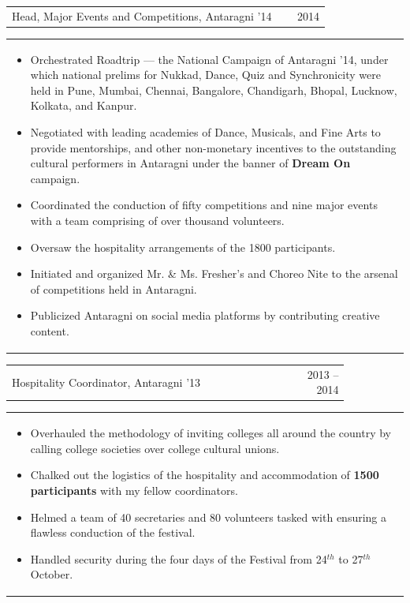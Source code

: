 \documentclass[a4paper,10pt]{article} %
\newcommand{\iproject}[3]{
    \begin{tabular}{p{0.85\linewidth}r}
        \textcolor{NavyBlue}{#2} & \multicolumn{1}{m{3cm}}{\raggedleft \textsc{#1}}\\
    \end{tabular}
    \begin{tabular}{p{\linewidth}}
    \vspace{-0.3cm}
        \footnotesize{#3}
    \end{tabular}
    \vspace{-0.5cm}
}
\begin{document}
\iproject {2014}
          {Head, Major Events and Competitions, Antaragni '14}
          {
               \begin{itemize}[leftmargin=0.5cm]
                    \item Orchestrated Roadtrip --- the National Campaign of Antaragni '14, under which national prelims for Nukkad,
                        Dance, Quiz and Synchronicity were held in Pune, Mumbai, Chennai, Bangalore, Chandigarh, Bhopal, Lucknow,
                        Kolkata, and Kanpur.
                    \item Negotiated with leading academies of Dance, Musicals, and Fine Arts to provide mentorships, and other
                        non-monetary incentives to the outstanding cultural performers in Antaragni under the banner
                        of \textbf{Dream On} campaign.
                    \item Coordinated the conduction of fifty competitions and nine major events with a team comprising of over
                        thousand volunteers.
                    \item Oversaw the hospitality arrangements of the 1800 participants.
                    \item Initiated and organized Mr. \& Ms. Fresher's and Choreo Nite to the arsenal of competitions
                        held in Antaragni.
                    \item Publicized Antaragni on social media platforms by contributing creative content.
               \end{itemize}
          }

\iproject {2013 -- 2014}
          {Hospitality Coordinator, Antaragni '13}
          {
               \begin{itemize}[leftmargin=0.5cm]
                   \item Overhauled the methodology of inviting colleges all around the country by calling college societies over college cultural unions.
                   \item Chalked out the logistics of the hospitality and accommodation of \textbf{1500 participants} with my fellow coordinators.
                   \item Helmed a team of 40 secretaries and 80 volunteers tasked with ensuring a flawless conduction of the festival.
                   \item Handled security during the four days of the Festival from 24$^{th}$ to 27$^{th}$ October.
               \end{itemize}
          }
\end{document}
